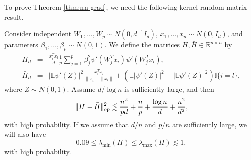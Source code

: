 To prove Theorem \ref{thm:nn-grad}, we need the following kernel random matrix result.
\begin{lemma}\label{lem:lim-H}
Consider independent $W_1,\ldots,W_p\sim N(0,d^{-1}I_d)$, $x_1,\ldots,x_n\sim N(0,I_d)$, and parameters $\beta_1,\ldots,\beta_p\sim N(0,1)$. We define the matrices $H, \bar{H}\in\mathbb{R}^{n\times n}$ by
\begin{eqnarray*}
H_{il} &=& \frac{x_i^Tx_l}{d}\frac{1}{p}\sum_{j=1}^p\beta_j^2\psi'(W^T_jx_i)\psi'(W_j^Tx_l), \\
\bar{H}_{il} &=& |\mathbb{E}\psi'(Z)|^2\frac{x_i^Tx_l}{\|x_i\|\|x_l\|} + \left(\mathbb{E}|\psi'(Z)|^2-|\mathbb{E}\psi'(Z)|^2\right)\mathbb{I}\{i=l\},
\end{eqnarray*}
where $Z\sim N(0,1)$.
Assume $d/\log n$ is sufficiently large, and then
$$\|H-\bar{H}\|_{\rm op}^2 \lesssim \frac{n^2}{pd} + \frac{n}{p} + \frac{\log n}{d} + \frac{n^2}{d^2},$$
with high probability. If we assume that $d/n$ and $p/n$ are sufficiently large, we will also have
\begin{equation}
0.09\leq\lambda_{\min}(H)\leq \lambda_{\max}(H)\lesssim 1, \label{eq:spectrum-H-bound}
\end{equation}
with high probability.
\end{lemma}
